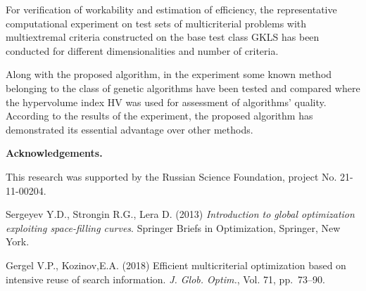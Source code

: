 \documentclass[oribibl]{llncs}
\begin{document}
For verification of workability and estimation of efficiency, the representative computational experiment on test sets of multicriterial problems with multiextremal criteria constructed on the base test class GKLS  has been conducted for different dimensionalities and number of criteria. 

Along with the proposed algorithm, in the experiment some known method belonging to the class of genetic algorithms have been tested and compared where the hypervolume index  HV was used for assessment of algorithms' quality. According to the results of the experiment, the proposed algorithm  has demonstrated its essential advantage over other methods.


\textbf{Acknowledgements.}

This research was supported by the Russian Science Foundation, project No. 21-11-00204.

 \vspace{0.5cm}

\begin{thebibliography}{4}

Sergeyev Y.D., Strongin R.G., Lera D. (2013) \emph{Introduction to global optimization exploiting space-filling curves}. Springer Briefs in Optimization, Springer, New York.

Gergel V.P., Kozinov,E.A. (2018) Efficient multicriterial optimization based on intensive reuse of search information. \emph{J. Glob. Optim.},  Vol. 71, pp.~73--90.


\end{thebibliography}
\end{document}
